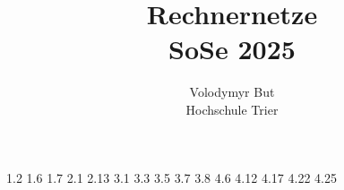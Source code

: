 \documentclass[10pt, oneside]{article}
\title{Rechnernetze\\[10pt]\Large{SoSe 2025}}
\author{Volodymyr But\\[10pt]Hochschule Trier}
\date{}
\begin{document}
\maketitle
\vspace{25px}

{1.2}
{1.6}
{1.7}
{2.1}
{2.13}
{3.1}
\pagebreak
{3.3}
{3.5}
\pagebreak
{3.7}
{3.8}
{4.6}
{4.12}
{4.17}
{4.22}
{4.25}
\end{document}
